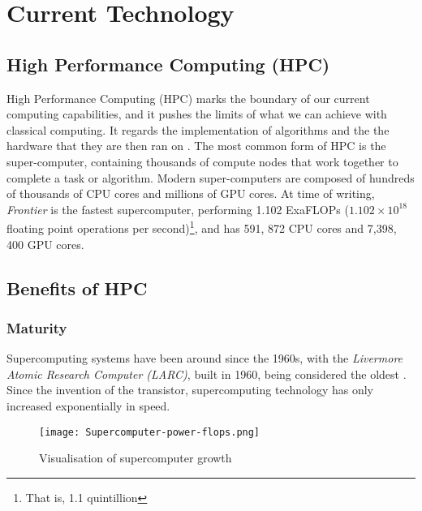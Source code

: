 {}
\section*{Current Technology}

{}
\subsection*{High Performance Computing (HPC)}
High Performance Computing (HPC) marks the boundary of our current computing capabilities, and it pushes the limits of what we can achieve with classical computing. It regards the implementation of algorithms and the the hardware that they are then ran on \cite{hager2010introduction}. The most common form of HPC is the super-computer, containing thousands of compute nodes that work together to complete a task or algorithm. Modern super-computers are composed of hundreds of thousands of CPU cores and millions of GPU cores. At time of writing, \textit{Frontier} is the fastest supercomputer, performing 1.102 ExaFLOPs \cite{frontier} ($1.102\times 10^{18}$ floating point operations per second)\footnote{That is, 1.1 quintillion}, and has 591, 872 CPU cores and 7,398, 400 GPU cores.

{}
\subsection*{Benefits of HPC}

{}
\subsubsection*{Maturity}
Supercomputing systems have been around since the 1960s, with the \textit{Livermore Atomic Research Computer (LARC)}, built in 1960, being considered the oldest \cite{first_super}. Since the invention of the transistor, supercomputing technology has only increased exponentially in speed.

\begin{figure}[H]
	\centering
	\texttt{[image: Supercomputer-power-flops.png]}
	\caption{Visualisation of supercomputer growth \cite{supercomputer-power-flops}}
	\label{fig:supercomputer-power-flops}
\end{figure}

